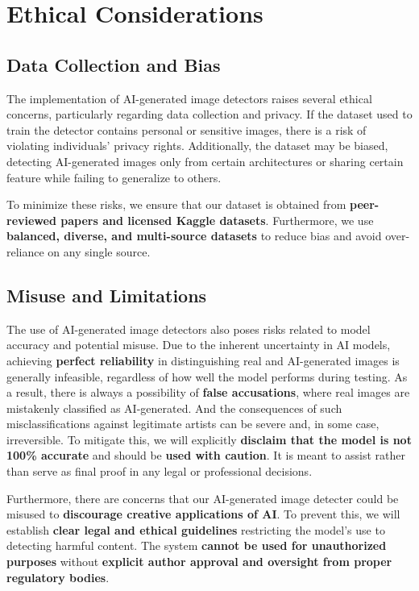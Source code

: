 \documentclass{article} %
\begin{document}
\section{Ethical Considerations}
\label{ethical}

\subsection{Data Collection and Bias}
The implementation of AI-generated image detectors raises several ethical concerns, particularly regarding data collection and privacy. If the dataset used to train the detector contains personal or sensitive images, there is a risk of violating individuals' privacy rights. Additionally, the dataset may be biased, detecting AI-generated images only from certain architectures or sharing certain feature while failing to generalize to others.

To minimize these risks, we ensure that our dataset is obtained from \textbf{peer-reviewed papers and licensed Kaggle datasets}. Furthermore, we use \textbf{balanced, diverse, and multi-source datasets} to reduce bias and avoid over-reliance on any single source.

\subsection{Misuse and Limitations}
The use of AI-generated image detectors also poses risks related to model accuracy and potential misuse. Due to the inherent uncertainty in AI models, achieving \textbf{perfect reliability} in distinguishing real and AI-generated images is generally infeasible, regardless of how well the model performs during testing. As a result, there is always a possibility of \textbf{false accusations}, where real images are mistakenly classified as AI-generated. And the consequences of such misclassifications against legitimate artists can be severe and, in some case, irreversible. To mitigate this, we will explicitly \textbf{disclaim that the model is not 100\% accurate} and should be \textbf{used with caution}. It is meant to assist rather than serve as final proof in any legal or professional decisions.

Furthermore, there are concerns that our AI-generated image detecter could be misused to \textbf{discourage creative applications of AI}. To prevent this, we will establish \textbf{clear legal and ethical guidelines} restricting the model’s use to detecting harmful content. The system \textbf{cannot be used for unauthorized purposes} without \textbf{explicit author approval and oversight from proper regulatory bodies}.
\end{document}
